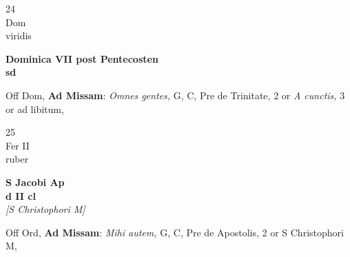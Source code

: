 \documentclass[10pt, openany]{book}
\begin{document}
        \begin{center}
            \begin{minipage}{3.5in}
                \vspace{2em}
                \begin{minipage}{0.5in}
                    {\Huge 24} \\
                    {\normalsize Dom} \\
                    {\normalsize viridis}
                \end{minipage}
                \begin{minipage}{3.0in}
                    \textbf{ \large Dominica VII post Pentecosten \\
                    \textnormal{\normalsize sd}} \\ 
                \end{minipage}
                \begin{justify}Off Dom, \textbf{Ad Missam}: \textit{Omnes gentes,} G, C, Pre de Trinitate, 2 or \textit{A cunctis,} 3 or ad libitum,   
                \end{justify}
            \end{minipage}
        \end{center}
    
        \begin{center}
            \begin{minipage}{3.5in}
                \vspace{2em}
                \begin{minipage}{0.5in}
                    {\Huge 25} \\
                    {\normalsize Fer II} \\
                    {\normalsize ruber}
                \end{minipage}
                \begin{minipage}{3.0in}
                    \textbf{ \large S Jacobi Ap \\
                    \textnormal{\normalsize d II cl}} \\ \textit{[S Christophori M]} \\ 
                \end{minipage}
                \begin{justify}Off Ord, \textbf{Ad Missam}: \textit{Mihi autem,} G, C, Pre de Apostolis, 2 or S Christophori M,   
                \end{justify}
            \end{minipage}
        \end{center}
    
\end{document}
